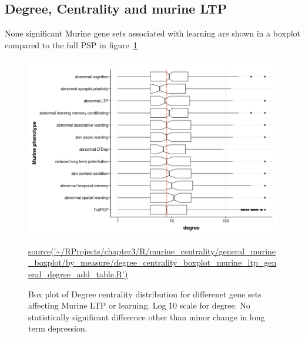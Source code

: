 \subsection{Degree, Centrality and murine LTP}
None significant
Murine gene sets associated with learning are shown in a boxplot compared to the full PSP in figure~\ref{fig:murine_ltp_centrality_boxplot_degree1}


\begin{figure}
    \centering
    \includegraphics[width=\textwidth]{images/chapter3/ggplot2/murine_centrality_boxplot/add_theme/addLTP/Rplot_murine_degree_ltp.png}
    \caption{Box plot of Degree centrality distribution for differenet gene sets affecting Murine LTP or learning. Log 10 scale for degree. No statistically significant difference other than minor change in long term depression.} 
    \tiny\url{source('~/RProjects/chapter3/R/murine_centrality/general_murine_boxplot/by_measure/degree_centrality_boxplot_murine_ltp_general_degree_add_table.R')}
    \label{fig:murine_ltp_centrality_boxplot_degree1}
\end{figure}



